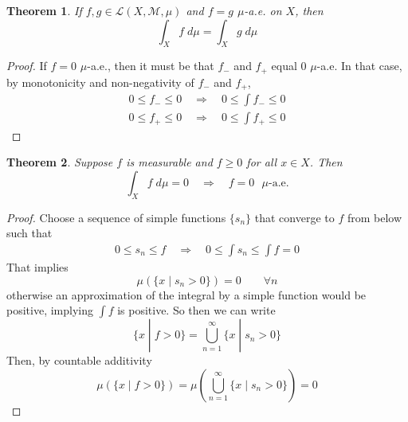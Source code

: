 \documentclass[12pt]{article}
\theoremstyle{plain}
\newtheorem{thm}{Theorem}[subsection]
\theoremstyle{definition}
\theoremstyle{remark}
\begin{document}
\begin{thm}
If $f,g\in\mathscr{L}(X,\mathscr{M},\mu)$ and $f=g$ $\mu$-a.e. on $X$, then 
\[
    \int_X f \; d\mu = \int_X g \; d\mu
\]
\end{thm}
\begin{proof}
If $f=0$ $\mu$-a.e., then it must be that $f_-$ and $f_+$ equal 0 $\mu$-a.e. In that case, by monotonicity and non-negativity of $f_-$ and $f_+$, 
\begin{align*}
    0 \leq f_- \leq 0  
    \quad \Rightarrow \quad
    0 \leq \int f_- \leq 0  \\
    0 \leq f_+ \leq 0  
    \quad \Rightarrow \quad
    0 \leq \int f_+ \leq 0  
\end{align*}
\end{proof}


\begin{thm}
Suppose $f$ is measurable and $f\geq 0$ for all $x\in X$. Then 
\[
    \int_X f \; d\mu = 0 \quad \Rightarrow\quad
    f = 0 \text{ $\mu$-a.e.}
\]
\end{thm}
\begin{proof}
Choose a sequence of simple functions $\{s_n\}$ that converge to $f$ from below such that 
\begin{align*}
    0 \leq s_n \leq f 
    \quad\Rightarrow\quad
    0 \leq \int s_n \leq \int f = 0
\end{align*}
That implies 
\[
    \mu\left(\{x \; | \; s_n > 0 \}\right) = 0
    \qquad \forall n
\]
otherwise an approximation of the integral by a simple function would be positive, implying $\int f$ is positive. So then we can write
\[
    \{x \; | \; f>0 \} =    
    \bigcup^\infty_{n=1} \{x \; | \; s_n>0 \} 
\]
Then, by countable additivity
\[
    \mu\left(\{x \; | \; f>0 \} \right)=    
    \mu\left(\bigcup^\infty_{n=1} \{x \; | \; s_n>0 \} 
    \right) = 0
\]
\end{proof}
\end{document}

